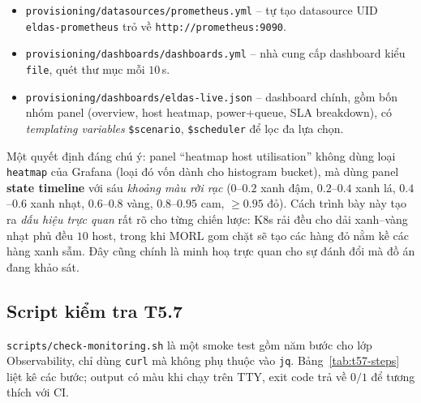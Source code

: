 \begin{itemize}
  \item \texttt{provisioning/datasources/prometheus.yml} -- tự tạo
        datasource UID \texttt{eldas-prometheus} trỏ về
        \texttt{http://prometheus:9090}.
  \item \texttt{provisioning/dashboards/dashboards.yml} -- nhà cung cấp
        dashboard kiểu \texttt{file}, quét thư mục mỗi $10$\,s.
  \item \texttt{provisioning/dashboards/eldas-live.json} -- dashboard
        chính, gồm bốn nhóm panel (overview, host heatmap, power+queue,
        SLA breakdown), có \emph{templating variables}
        \texttt{\$scenario}, \texttt{\$scheduler} để lọc đa lựa chọn.
\end{itemize}

Một quyết định đáng chú ý: panel ``heatmap host utilisation'' không
dùng loại \texttt{heatmap} của Grafana (loại đó vốn dành cho
histogram bucket), mà dùng panel \textbf{state timeline} với sáu
\emph{khoảng màu rời rạc} ($0$--$0.2$ xanh đậm, $0.2$--$0.4$ xanh lá,
$0.4$--$0.6$ xanh nhạt, $0.6$--$0.8$ vàng, $0.8$--$0.95$ cam,
$\geq 0.95$ đỏ). Cách trình bày này tạo ra \emph{dấu hiệu trực quan}
rất rõ cho từng chiến lược: K8s rải đều cho dải xanh--vàng nhạt phủ
đều $10$ host, trong khi MORL gom chặt sẽ tạo các hàng đỏ nằm kề các
hàng xanh sẫm. Đây cũng chính là minh hoạ trực quan cho sự đánh đổi
mà đồ án đang khảo sát.

\subsection{Script kiểm tra T5.7}
\texttt{scripts/check-monitoring.sh} là một smoke test gồm năm bước
cho lớp Observability, chỉ dùng \texttt{curl} mà không phụ thuộc vào
\texttt{jq}. Bảng~\ref{tab:t57-steps} liệt kê các bước; output có
màu khi chạy trên TTY, exit code trả về $0/1$ để tương thích với CI.

